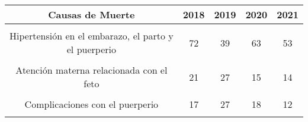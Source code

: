 \begin{tabular}[t]{ccccc}
\toprule
\textbf{Causas de Muerte} & \textbf{2018} & \textbf{2019} & \textbf{2020} & \textbf{2021}\\
\midrule
\cellcolor[HTML]{B6B3FF}{Embarazo terminado en aborto} & \cellcolor[HTML]{B6B3FF}{19} & \cellcolor[HTML]{B6B3FF}{23} & \cellcolor[HTML]{B6B3FF}{10} & \cellcolor[HTML]{B6B3FF}{14}\\
Hipertensión en el embarazo, el parto y el puerperio & 72 & 39 & 63 & 53\\
\cellcolor[HTML]{B6B3FF}{Otros trastornos maternos} & \cellcolor[HTML]{B6B3FF}{8} & \cellcolor[HTML]{B6B3FF}{6} & \cellcolor[HTML]{B6B3FF}{12} & \cellcolor[HTML]{B6B3FF}{9}\\
Atención materna relacionada con el feto & 21 & 27 & 15 & 14\\
\cellcolor[HTML]{B6B3FF}{Complicaciones del trabajo de parto} & \cellcolor[HTML]{B6B3FF}{117} & \cellcolor[HTML]{B6B3FF}{103} & \cellcolor[HTML]{B6B3FF}{101} & \cellcolor[HTML]{B6B3FF}{83}\\
Complicaciones con el puerperio & 17 & 27 & 18 & 12\\
\cellcolor[HTML]{B6B3FF}{Otras afecciones obstétricas} & \cellcolor[HTML]{B6B3FF}{38} & \cellcolor[HTML]{B6B3FF}{21} & \cellcolor[HTML]{B6B3FF}{40} & \cellcolor[HTML]{B6B3FF}{105}\\
\bottomrule
\end{tabular}
